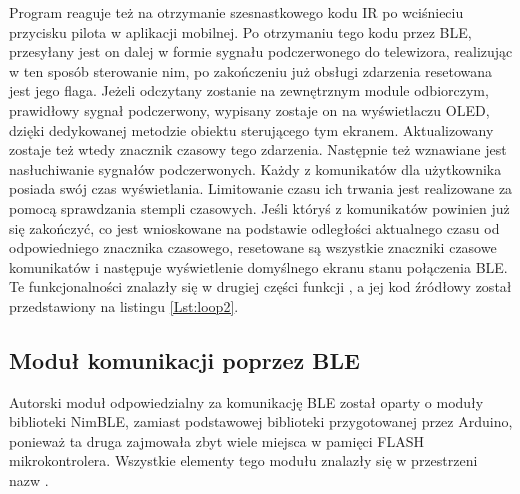 \documentclass[12pt,twoside]{article}
\begin{document}
\begin{figure}[!ht]

\end{figure}

Program reaguje też na otrzymanie szesnastkowego kodu IR po wciśnieciu przycisku  pilota w aplikacji mobilnej. Po otrzymaniu tego kodu przez BLE, przesyłany jest on dalej w formie sygnału podczerwonego do telewizora, realizując w ten sposób sterowanie nim, po zakończeniu już obsługi zdarzenia resetowana jest jego flaga. Jeżeli odczytany zostanie na zewnętrznym module odbiorczym, prawidłowy sygnał podczerwony, wypisany zostaje on na wyświetlaczu OLED, dzięki dedykowanej metodzie obiektu sterującego tym ekranem. Aktualizowany zostaje też wtedy znacznik czasowy tego zdarzenia. Następnie też wznawiane jest nasłuchiwanie sygnałów podczerwonych. Każdy z komunikatów dla użytkownika posiada swój czas wyświetlania. Limitowanie czasu ich trwania jest realizowane za pomocą sprawdzania stempli czasowych. Jeśli któryś z komunikatów powinien już się zakończyć, co jest wnioskowane na podstawie odległości aktualnego czasu od odpowiedniego znacznika czasowego, resetowane są wszystkie znaczniki czasowe komunikatów i następuje wyświetlenie domyślnego ekranu stanu połączenia BLE. Te funkcjonalności znalazły się w drugiej części funkcji , a jej kod źródłowy został przedstawiony na listingu \ref{Lst:loop2}.



\subsection{Moduł komunikacji poprzez BLE}
Autorski moduł odpowiedzialny za komunikację BLE został oparty o moduły biblioteki NimBLE\cite{nimBLE}, zamiast podstawowej biblioteki przygotowanej przez Arduino, ponieważ ta druga zajmowała zbyt wiele miejsca w pamięci FLASH mikrokontrolera. Wszystkie elementy tego modułu znalazły się w przestrzeni nazw .
\end{document}
